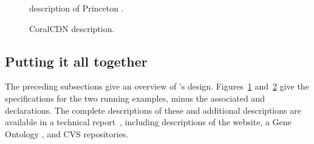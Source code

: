 \begin{figure}

\caption{\forest{} description of Princeton \filestore{}. 
}
\label{fig:student-description}
\end{figure}


\begin{figure}

\caption{\forest{} CoralCDN description. 
}
\label{fig:coral-description}
\end{figure}


\subsection{Putting it all together}

The preceding subsections give an overview of \forest{}'s design.
Figures~\ref{fig:student-description} and~\ref{fig:coral-description}
give the specifications for the two running examples, minus the
associated \padshaskell{} and \haskell{} declarations.  The complete
descriptions of these \filestores{} and additional descriptions are
available in a technical report~\cite{forest-techreport}, including
descriptions of the \pads{} website, a Gene Ontology \filestore{}, and
CVS repositories.

